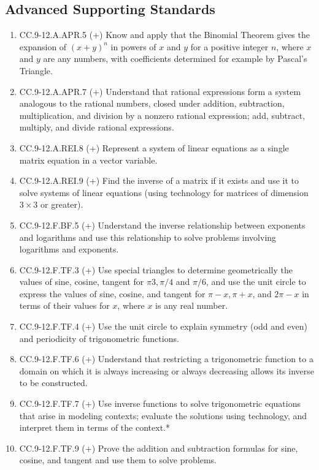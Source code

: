 \documentclass{article}
\begin{document}
\subsection*{Advanced Supporting Standards}
\begin{enumerate}
	\item CC.9-12.A.APR.5 (+) Know and apply that the Binomial Theorem gives the expansion of $(x + y)^n$ in powers of $x$ and $y$ for a positive integer $n$, where $x$ and $y$ are any numbers, with coefficients determined for example by Pascal’s Triangle. 
	\item CC.9-12.A.APR.7 (+)  Understand that rational expressions form a system analogous to the rational numbers, closed under addition, subtraction, multiplication, and division by a nonzero rational expression; add, subtract, multiply, and divide rational expressions.
	\item CC.9-12.A.REI.8 (+)  Represent a system of linear equations as a single matrix equation in a vector variable.
	\item CC.9-12.A.REI.9 (+)  Find the inverse of a matrix if it exists and use it to solve systems of linear equations (using technology for matrices of dimension $3 \times 3$ or greater).
	\item CC.9-12.F.BF.5 (+) Understand the inverse relationship between exponents and logarithms and use this relationship to solve problems involving logarithms and exponents.
	\item CC.9-12.F.TF.3 (+)  Use special triangles to determine geometrically the values of sine, cosine, tangent for $\pi3, \pi/4$ and $\pi/6$, and use the unit circle to express the values of sine, cosine, and tangent for $\pi - x, \pi + x$, and $2\pi - x$ in terms of their values for $x$, where $x$ is any real number.
	\item CC.9-12.F.TF.4 (+)  Use the unit circle to explain symmetry (odd and even) and periodicity of trigonometric functions.
	\item CC.9-12.F.TF.6 (+)  Understand that restricting a trigonometric function to a domain on which it is always increasing or always decreasing allows its inverse to be constructed.
	\item CC.9-12.F.TF.7 (+) Use inverse functions to solve trigonometric equations that arise in modeling contexts; evaluate the solutions using technology, and interpret them in terms of the context.*
	\item CC.9-12.F.TF.9 (+)  Prove the addition and subtraction formulas for sine, cosine, and tangent and use them to solve problems.

\end{enumerate}
\end{document}
